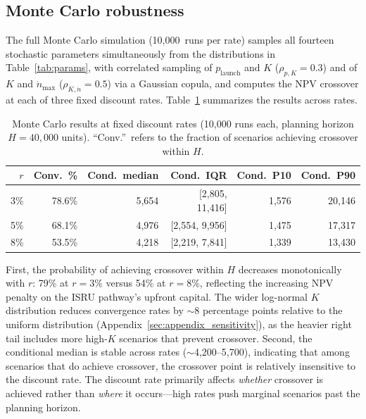 \documentclass[preprint,12pt]{elsarticle}
\begin{document}
\subsection{Monte Carlo robustness}
\label{sec:mc_robustness}

The full Monte Carlo simulation (10{,}000~runs per rate) samples all fourteen stochastic parameters simultaneously from the distributions in Table~\ref{tab:params}, with correlated sampling of $p_{\mathrm{launch}}$ and $K$ ($\rho_{p,K} = 0.3$) and of $K$ and $\dot{n}_{\max}$ ($\rho_{K,\dot{n}} = 0.5$) via a Gaussian copula, and computes the NPV crossover at each of three fixed discount rates. Table~\ref{tab:mc_summary} summarizes the results across rates.

\begin{table}[htbp]
\centering
\caption{Monte Carlo results at fixed discount rates (10{,}000 runs each, planning horizon $H = 40{,}000$ units). ``Conv.''\ refers to the fraction of scenarios achieving crossover within $H$.}
\label{tab:mc_summary}
\small
\begin{tabular}{@{}rrrrrr@{}}
\toprule
$r$ & Conv.\ \% & Cond.\ median & Cond.\ IQR & Cond.\ P10 & Cond.\ P90 \\
\midrule
3\%  & 78.6\% & 5{,}654 & [2{,}805, 11{,}416] & 1{,}576 & 20{,}146 \\
5\%  & 68.1\% & 4{,}976 & [2{,}554, 9{,}956]  & 1{,}475 & 17{,}317 \\
8\%  & 53.5\% & 4{,}218 & [2{,}219, 7{,}841]  & 1{,}339 & 13{,}430 \\
\bottomrule
\end{tabular}
\end{table}

First, the probability of achieving crossover within $H$ decreases monotonically with $r$: 79\% at $r = 3\%$ versus 54\% at $r = 8\%$, reflecting the increasing NPV penalty on the ISRU pathway's upfront capital. The wider log-normal $K$ distribution reduces convergence rates by $\sim$8 percentage points relative to the uniform distribution (Appendix~\ref{sec:appendix_sensitivity}), as the heavier right tail includes more high-$K$ scenarios that prevent crossover. Second, the conditional median is stable across rates ($\sim$4{,}200--5{,}700), indicating that among scenarios that do achieve crossover, the crossover point is relatively insensitive to the discount rate. The discount rate primarily affects \emph{whether} crossover is achieved rather than \emph{where} it occurs---high rates push marginal scenarios past the planning horizon.
\end{document}
